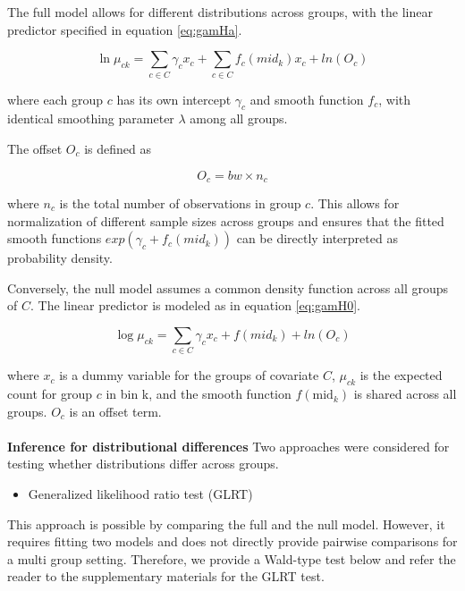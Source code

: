 The full model allows for different distributions across groups, with the linear predictor specified in equation \ref{eq:gamHa}.

\begin{equation}
    \ln \mu_{ck} = \sum_{c \in C}\gamma_cx_c + \sum_{c \in C} f_c(mid_k)x_c + ln(O_c)
    \label{eq:gamHa}
\end{equation}

where each group $c$ has its own intercept $\gamma_c$ and smooth function $f_c$, with identical smoothing parameter $\lambda$ among all groups.

The offset $O_c$ is defined as

\begin{equation}
    O_c = bw \times n_c
    \label{eq:offset}
\end{equation}

where $n_c$ is the total number of observations in group $c$. This allows for normalization of different sample sizes across groups and ensures that the fitted smooth functions $exp(\gamma_c + f_c(mid_k))$ can be directly interpreted as probability density.

Conversely, the null model assumes a common density function across all groups of $C$. The linear predictor is modeled as in equation \ref{eq:gamH0}.

\begin{equation}
    \log \mu_{ck} = \sum_{c \in C}\gamma_cx_c + f(mid_k) + ln(O_c)
    \label{eq:gamH0}
\end{equation}

where $x_c$ is a dummy variable for the groups of covariate $C$,  $\mu_{ck}$ is the expected count for group $c$ in bin k, and the smooth function $f(\text{mid}_k)$ is shared across all groups. $O_c$ is an offset term.
\\
\\
\textbf{Inference for distributional differences} 
Two approaches were considered for testing whether distributions differ across groups.

\begin{itemize}
    \item Generalized likelihood ratio test (GLRT)
\end{itemize}
This approach is possible by comparing the full and the null model. However, it requires fitting two models and does not directly provide pairwise comparisons for a multi group setting. Therefore, we provide a Wald-type test below and refer the reader to the supplementary materials for the GLRT test.

